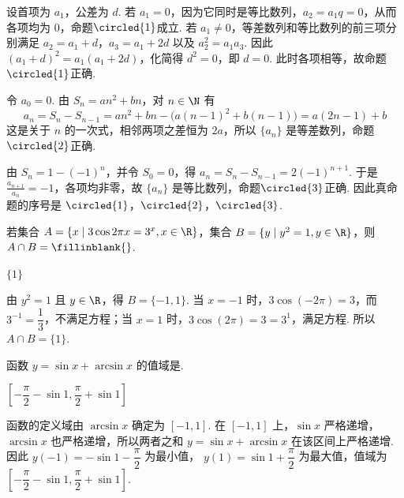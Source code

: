 \begin{solution}
设首项为 \(a_1\)，公差为 \(d\). 若 \(a_1=0\)，因为它同时是等比数列，\(a_2=a_1q=0\)，从而各项均为 \(0\)，命题\(\circled{1}\)成立. 若 \(a_1\neq0\)，等差数列和等比数列的前三项分别满足
\(a_2=a_1+d\)，\(a_3=a_1+2d\) 以及 \(a_2^2=a_1a_3\). 因此
\((a_1+d)^2=a_1(a_1+2d)\)，化简得 \(d^2=0\)，即 \(d=0\). 此时各项相等，故命题\(\circled{1}\)正确.

令 \(a_0=0\). 由 \(S_n=an^{2}+bn\)，对 \(n\in\N\) 有
\[
a_n=S_n-S_{n-1}=an^2+bn-\bigl(a(n-1)^2+b(n-1)\bigr)=a(2n-1)+b
\]
这是关于 \(n\) 的一次式，相邻两项之差恒为 \(2a\)，所以 \(\{a_n\}\) 是等差数列，命题\(\circled{2}\)正确.

由 \(S_n=1-(-1)^n\)，并令 \(S_0=0\)，得
\(a_n=S_n-S_{n-1}=2(-1)^{n+1}\). 于是
\(\displaystyle\frac{a_{n+1}}{a_n}=-1\)，各项均非零，故 \(\{a_n\}\) 是等比数列，命题\(\circled{3}\)正确. 因此真命题的序号是 \(\circled{1}\)，\(\circled{2}\)，\(\circled{3}\).
\end{solution}

\begin{problem}
若集合 \(A = \{x \mid 3\cos 2\pi x = 3^x, x \in \R\}\)，集合 \(B = \{y \mid y^2 = 1, y \in \R\}\)，则 \(A \cap B =\fillinblank{}\).
\end{problem}

\begin{answer}
\(\{1\}\)
\end{answer}

\begin{solution}
由 \(y^{2}=1\) 且 \(y\in\R\)，得 \(B=\{-1,1\}\). 当 \(x=-1\) 时，\(3\cos(-2\pi)=3\)，而 \(3^{-1}=\dfrac{1}{3}\)，不满足方程；当 \(x=1\) 时，\(3\cos(2\pi)=3=3^{1}\)，满足方程. 所以 \(A\cap B=\{1\}\).
\end{solution}

\begin{problem}
函数 \( y = \sin x + \arcsin x \) 的值域是\fillinblank{}.
\end{problem}

\begin{answer}
\(\left[-\dfrac{\pi}{2}-\sin1,\dfrac{\pi}{2}+\sin1\right]\)
\end{answer}

\begin{solution}
函数的定义域由 \(\arcsin x\) 确定为 \([-1,1]\). 在 \([-1,1]\) 上，\(\sin x\) 严格递增，\(\arcsin x\) 也严格递增，所以两者之和
\(y=\sin x+\arcsin x\) 在该区间上严格递增. 因此
\(y(-1)=-\sin1-\dfrac\pi2\) 为最小值，
\(y(1)=\sin1+\dfrac\pi2\) 为最大值，值域为
\(\left[-\dfrac\pi2-\sin1,\dfrac\pi2+\sin1\right]\).
\end{solution}

